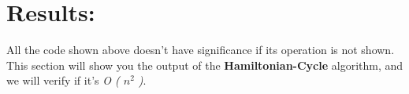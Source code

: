 \section{Results:}

All the code shown above doesn't have significance if its operation is not shown. This section will show you the output of the {\bfseries Hamiltonian-Cycle} algorithm, and we will verify if it's {\itshape O ( $n^{2}$ )}. \hfill \break
